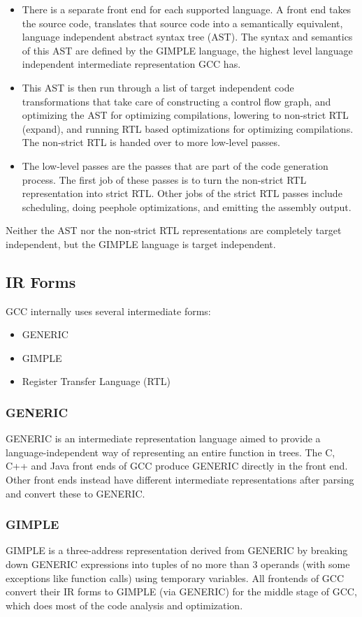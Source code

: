 \begin{itemize}
	\item There is a separate front end for each supported language. A front end takes the source code, translates that source code into a semantically equivalent, language independent abstract syntax tree (AST). The syntax and semantics of this AST are defined by the GIMPLE language, the highest level language independent intermediate representation GCC has.
	\item This AST is then run through a list of target independent code transformations that take care of constructing a control flow graph, and optimizing the AST for optimizing compilations, lowering to non-strict RTL (expand), and running RTL based optimizations for optimizing compilations. The non-strict RTL is handed over to more low-level passes.
	\item The low-level passes are the passes that are part of the code generation process. The first job of these passes is to turn the non-strict RTL representation into strict RTL. Other jobs of the strict RTL passes include scheduling, doing peephole optimizations, and emitting the assembly output.
\end{itemize}
	Neither the AST nor the non-strict RTL representations are completely target independent, but the GIMPLE language is target independent.

\subsection{IR Forms}
GCC internally uses several intermediate forms:
\begin{itemize}
	\item GENERIC
	\item GIMPLE
	\item Register Transfer Language (RTL)
\end{itemize}

\subsubsection{GENERIC}
GENERIC\cite{generic} is an intermediate representation language aimed to provide a language-independent way of representing an entire function in trees. The C, C++ and Java front ends of GCC produce GENERIC directly in the front end. Other front ends instead have different intermediate representations after parsing and convert these to GENERIC.
\subsubsection{GIMPLE}
GIMPLE\cite{gimple} is a three-address representation derived from GENERIC by breaking down GENERIC expressions into tuples of no more than 3 operands (with some exceptions like function calls) using temporary variables. All frontends of GCC convert their IR forms to GIMPLE (via GENERIC) for the middle stage of GCC, which does most of the code analysis and optimization.
